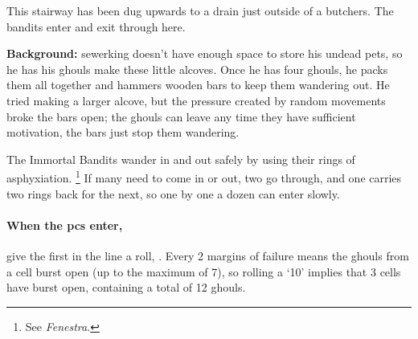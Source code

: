
\label{butcher_exit}

This stairway has been dug upwards to a drain just outside of a butchers.
The bandits enter and exit through here.


\textbf{Background:}
\Gls{sewerking} doesn't have enough space to store his undead pets, so he has his ghouls make these little alcoves.
Once he has four ghouls, he packs them all together and hammers wooden bars to keep them wandering out.
He tried making a larger alcove, but the pressure created by random movements broke the bars open; the ghouls can leave any time they have sufficient motivation, the bars just stop them wandering.

The Immortal Bandits wander in and out safely by using their rings of asphyxiation.%
\footnote{See \textit{Fenestra}\iftoggle{aif}{\autopageref{ring_asphyxiation}}{for more on these rings}.}
If many need to come in or out, two go through, and one carries two rings back for the next, so one by one a dozen can enter slowly.

\paragraph{When the \glspl{pc} enter,}
give the first in the line a  roll, \tn[16].
Every 2 margins of failure means the ghouls from a cell burst open (up to the maximum of 7), so rolling a `10' implies that 3 cells have burst open, containing a total of 12 ghouls.

